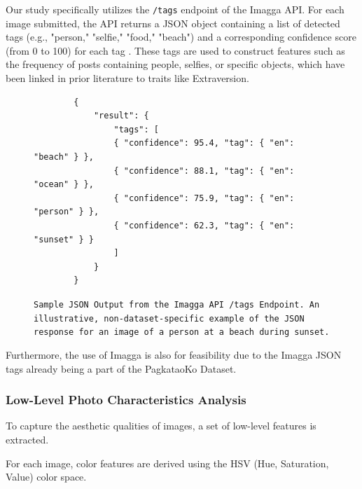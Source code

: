 Our study specifically utilizes the \texttt{/tags} endpoint of the Imagga API. For each image submitted, the API returns a JSON object containing a list of detected tags (e.g., "person," "selfie," "food," "beach") and a corresponding confidence score (from 0 to 100) for each tag \citep{imagga_docs}. These tags are used to construct features such as the frequency of posts containing people, selfies, or specific objects, which have been linked in prior literature to traits like Extraversion.

\begin{figure}[H]
	\centering
	\begin{verbatim}
		{
			"result": {
				"tags": [
				{ "confidence": 95.4, "tag": { "en": "beach" } },
				{ "confidence": 88.1, "tag": { "en": "ocean" } },
				{ "confidence": 75.9, "tag": { "en": "person" } },
				{ "confidence": 62.3, "tag": { "en": "sunset" } }
				]
			}
		}
	\end{verbatim}
	\caption{ \texttt{Sample JSON Output from the Imagga API /tags Endpoint. An illustrative, non-dataset-specific example of the JSON response for an image of a person at a beach during sunset.}}
	\label{fig:imagga_json}
\end{figure}

Furthermore, the use of Imagga is also for feasibility due to the Imagga JSON tags already being a part of the PagkataoKo Dataset.
\subsubsection{Low-Level Photo Characteristics Analysis}
To capture the aesthetic qualities of images, a set of low-level features is extracted.


For each image, color features are derived using the HSV (Hue, Saturation, Value) color space. 

